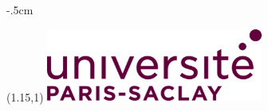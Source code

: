 
\begin{titlepage}
    \storeareas{\DefaultMargins}
    \areaset%
    {\textwidth} %
    {\dimexpr\the\paperheight-.5cm\relax} %
    \begin{textblock}{1} (1.15,1)
        \includegraphics[height=2.4cm]{./gfx/UPsac.png}
    \end{textblock}


\end{titlepage}
